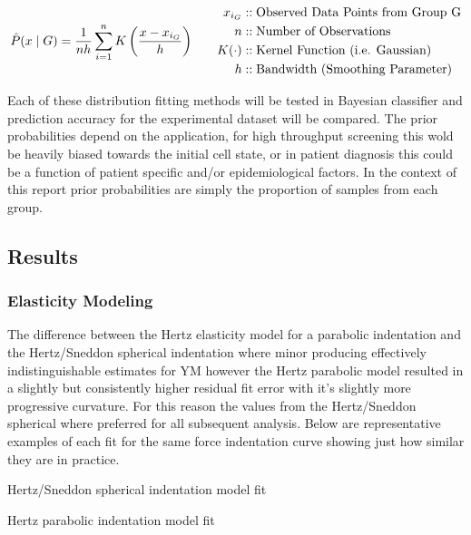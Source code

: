 \documentclass[
  paper=a4,
  ,captions=tableheading
]{scrartcl}
\makeatletter
\newcommand*\pandocbounded[1]{%
  \sbox\pandoc@box{#1}%
  \Gscale@div\@tempa{\textheight}{\dimexpr\ht\pandoc@box+\dp\pandoc@box\relax}%
  \Gscale@div\@tempb{\linewidth}{\wd\pandoc@box}%
  \ifdim\@tempb\p@<\@tempa\p@\let\@tempa\@tempb\fi%
  \ifdim\@tempa\p@<\p@\scalebox{\@tempa}{\usebox\pandoc@box}%
  \else\usebox{\pandoc@box}%
  \fi%
}
\renewenvironment{quote}{\begin{customblockquote}\list{}{\rightmargin=0em\leftmargin=0em}%
\item\relax\color{blockquote-text}\ignorespaces}{\unskip\unskip\endlist\end{customblockquote}}
\makeatother
\begin{document}
\[
{\large  
\hat{P}(x \mid G) =  
\frac{1}{n h} \sum_{i=1}^{n} K\left( \frac{x - x_{i_G}}{h} \right)  
}  
\qquad  
\begin{align}  
x_{i_G}           &:: \text{Observed Data Points from Group G}\\
n                 &:: \text{Number of Observations}\\
K(\cdot)          &:: \text{Kernel Function (i.e. Gaussian)}\\
h                 &:: \text{Bandwidth (Smoothing Parameter)}\\
\end{align}
\]

Each of these distribution fitting methods will be tested in Bayesian
classifier and prediction accuracy for the experimental dataset will be
compared. The prior probabilities depend on the application, for high
throughput screening this wold be heavily biased towards the initial
cell state, or in patient diagnosis this could be a function of patient
specific and/or epidemiological factors. In the context of this report
prior probabilities are simply the proportion of samples from each
group.

\subsection{Results}\label{results}

\subsubsection{Elasticity Modeling}\label{elasticity-modeling-1}

The difference between the Hertz elasticity model for a parabolic
indentation and the Hertz/Sneddon spherical indentation where minor
producing effectively indistinguishable estimates for YM however the
Hertz parabolic model resulted in a slightly but consistently higher
residual fit error with it's slightly more progressive curvature. For
this reason the values from the Hertz/Sneddon spherical where preferred
for all subsequent analysis. Below are representative examples of each
fit for the same force indentation curve showing just how similar they
are in practice.

\noindent
\begin{minipage}[t]{0.48\textwidth}
\begin{quote}
\pandocbounded{}
Hertz/Sneddon spherical indentation model fit
\end{quote}
\end{minipage}
\hfill
\begin{minipage}[t]{0.48\textwidth}
\begin{quote}
\pandocbounded{}
Hertz parabolic indentation model fit
\end{quote}
\end{minipage}
\end{document}
